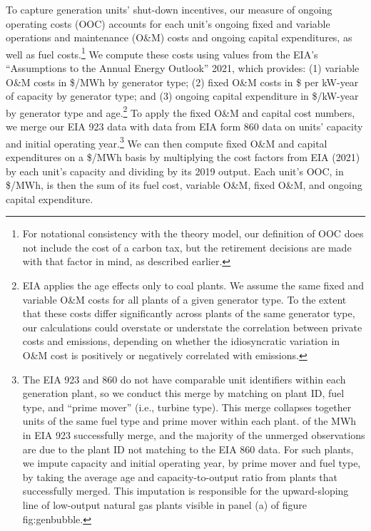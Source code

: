 \documentclass[12pt]{article}
\begin{document}
To capture generation units' shut-down incentives, our measure of ongoing operating costs (OOC) accounts for each unit's ongoing fixed and variable operations and maintenance (O\&M) costs and ongoing capital expenditures, as well as fuel costs.\footnote{For notational consistency with the theory model, our definition of OOC does not include the cost of a carbon tax, but the retirement decisions are made with that factor in mind, as described earlier.} We compute these costs using values from the EIA's ``Assumptions to the Annual Energy Outlook'' 2021, which provides: (1) variable O\&M costs in \$/MWh by generator type; (2) fixed O\&M costs in \$ per kW-year of capacity by generator type; and (3) ongoing capital expenditure in \$/kW-year by generator type and age.\footnote{EIA applies the age effects only to coal plants. We assume the same fixed and variable O\&M costs for all plants of a given generator type. To the extent that these costs differ significantly across plants of the same generator type, our calculations could overstate or understate the correlation between private costs and emissions, depending on whether the idiosyncratic variation in O\&M cost is positively or negatively correlated with emissions.} To apply the fixed O\&M and capital cost numbers, we merge our EIA 923 data with data from EIA form 860 data on units' capacity and initial operating year.\footnote{The EIA 923 and 860 do not have comparable unit identifiers within each generation plant, so we conduct this merge by matching on plant ID, fuel type, and ``prime mover'' (i.e., turbine type). This merge collapses together units of the same fuel type and prime mover within each plant. of the MWh in EIA 923 successfully merge, and the majority of the unmerged observations are due to the plant ID not matching to the EIA 860 data. For such plants, we impute capacity and initial operating year, by prime mover and fuel type, by taking the average age and capacity-to-output ratio from plants that successfully merged. This imputation is responsible for the upward-sloping line of low-output natural gas plants visible in panel (a) of figure {fig:genbubble}.} We can then compute fixed O\&M and capital expenditures on a \$/MWh basis by multiplying the cost factors from EIA (2021) by each unit's capacity and dividing by its 2019 output. Each unit's OOC, in \$/MWh, is then the sum of its fuel cost, variable O\&M, fixed O\&M, and ongoing capital expenditure.
\end{document}
